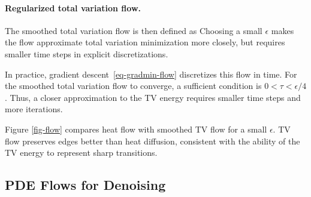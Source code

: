 

  
\paragraph{Regularized total variation flow.}

The smoothed total variation flow is then defined as
Choosing a small $\epsilon$ makes the flow approximate total variation minimization more closely, but requires smaller time steps in explicit discretizations.

In practice, gradient descent~\eqref{eq-gradmin-flow} discretizes this flow in time. For the smoothed total variation flow to converge, a sufficient condition is $0<\tau<\epsilon/4$. Thus, a closer approximation to the TV energy requires smaller time steps and more iterations.

Figure \ref{fig-flow} compares heat flow with smoothed TV flow for a small $\epsilon$. TV flow preserves edges better than heat diffusion, consistent with the ability of the TV energy to represent sharp transitions.

                                                                                          

                                
                                                                                                                                                                                                                                                                                                               
                            


                                                                      
\subsection{PDE Flows for Denoising}
\label{subsec-pde-denoise}

